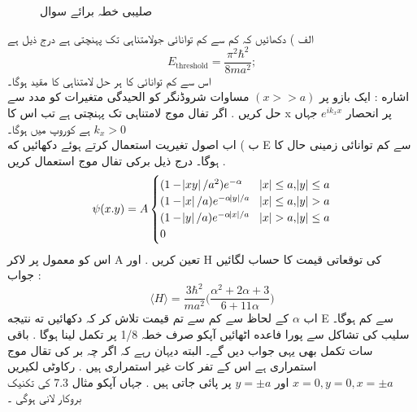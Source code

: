 \begin{figure}
\centering
{}
\caption{صلیبی  خطہ برائے سوال }
\label{شکل_تغیریت_صلیبی_خطہ}
\end{figure}

الف ) دکھائیں کہ کم سے کم توانائی جولامتناہی تک پہنچتی ہے درج ذیل ہے
\[E_{\text{threshold}}=\frac{\pi^{2}\hbar^{2}}{8ma^{2}};\]
اس سے کم توانائی کا ہر حل لامتناہی کا مقید ہوگا۔\\
اشاره : ایک بازو پر
\((x>>a)\)
مساوات شروڈنگر کو الحیدگی متغیرات کو مدد سے حل کریں . اگر تفال موج لامتناہی تک پہنچتی ہے تب اس کا x پر انحصار
\(e^{ik_{x}x}\)
جہاں
\(k_{x}>0\)
ہے کوروپ میں ہوگا۔\\
ب ) اب اصول تغیریت استعمال کرتے ہوئے دکھائیں که E سے کم توانائی زمینی حال کا ہوگا۔ درج ذیل برکی تفال موج استعمال کریں .
\[\psi(x.y)=A\begin{cases}
(1-\abs{xy}/a^{2})e^{-\alpha} & \abs{x}\leq a,\abs{y}\leq a\\
(1-\abs{x}/a)e^{-\alpha\abs{y}/a} & \abs{x}\leq a ,\abs{y}> a\\
(1-\abs{y}/a)e^{-\alpha\abs{x}/a} & \abs{x}> a,\abs{y}\leq a\\
0\\
\end{cases}\]
اس کو معمول پر لاکر A تعین کریں . اور H کی توقعاتی قیمت کا حساب لگائیں\\
جواب :
\[\langle H \rangle=\frac{3\hbar^{2}}{ma^{2}}\big (\frac{\alpha^{2}+2\alpha+3}{6+11\alpha}\big )\]
اب
\(\alpha\)
کے لحاظ سے کم سے تم قیمت تلاش کر کہ دکھائیں ته نتیجه E سے کم ہوگا۔ سلیب کی تشاکل سے پورا فاعده اٹھائیں آپکو صرف خطہ
1/8
پر تکمل لینا ہوگا . باقی سات تکمل بھی یہی جواب دیں گے۔ البته دیہان رہے کہ اگر چہ بر کی تقال موج استمراری ہے اس کے  تفر کات غیر استمراری ہیں . رکاوٹی لکیریں
\(x=0,y=0,x=\pm a\)
اور
\(y=\pm a\)
پر پائی جاتی ہیں . جہاں آپکو مثال 7.3 کی تکنیک بروکار لانی ہوگی ۔
